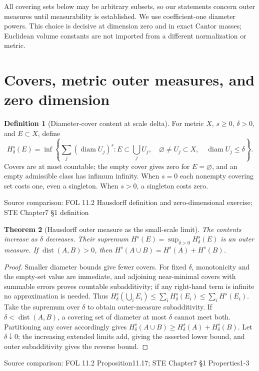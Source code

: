 \documentclass[11pt,oneside,openany]{book}
\newtheorem{theorem}{Theorem}[chapter]
\theoremstyle{definition}
\newtheorem{definition}[theorem]{Definition}
\theoremstyle{remark}
\DeclareMathOperator{\diam}{diam}\DeclareMathOperator{\dist}{dist}
\newcommand{\family}[1]{}
\newcommand{\source}[1]{\par\begingroup\small\sffamily\color{black!65}Source comparison: #1\par\endgroup}
\begin{document}
All covering sets below may be arbitrary subsets, so our statements concern outer measures until measurability is established. We use coefficient-one diameter powers. This choice is decisive at dimension zero and in exact Cantor masses; Euclidean volume constants are not imported from a different normalization or metric.

\section{Covers, metric outer measures, and zero dimension}

\begin{definition}[Diameter-cover content at scale delta]\family{D11.22.hausdorff_scale_content}\label{d11:22:hausdorff-scale-content}
For metric $X$, $s\ge0$, $\delta>0$, and $E\subset X$, define
\[H^s_\delta(E)=\inf\left\{\sum_j(\diam U_j)^s:E\subset\bigcup_jU_j,\quad \varnothing\ne U_j\subset X,\quad\diam U_j\le\delta\right\}.
\]
Covers are at most countable; the empty cover gives zero for $E=\varnothing$, and an empty admissible class has infimum infinity. When $s=0$ each nonempty covering set costs one, even a singleton. When $s>0$, a singleton costs zero.
\end{definition}
\source{FOL 11.2 Hausdorff definition and zero-dimensional exercise; STE Chapter7 §1 definition}

\begin{theorem}[Hausdorff outer measure as the small-scale limit]\family{D11.22.hausdorff_outer_measure}\label{d11:22:hausdorff-outer-measure}
The contents increase as $\delta$ decreases. Their supremum $H^s(E)=\sup_{\delta>0}H^s_\delta(E)$ is an outer measure. If $\dist(A,B)>0$, then $H^s(A\cup B)=H^s(A)+H^s(B)$.
\end{theorem}
\begin{proof}
Smaller diameter bounds give fewer covers. For fixed $\delta$, monotonicity and the empty-set value are immediate, and adjoining near-minimal covers with summable errors proves countable subadditivity; if any right-hand term is infinite no approximation is needed. Thus
$H^s_\delta(\bigcup_iE_i)\le\sum_iH^s_\delta(E_i)\le\sum_iH^s(E_i)$.
Take the supremum over $\delta$ to obtain outer-measure subadditivity. If $\delta<\dist(A,B)$, a covering set of diameter at most $\delta$ cannot meet both. Partitioning any cover accordingly gives $H^s_\delta(A\cup B)\ge H^s_\delta(A)+H^s_\delta(B)$. Let $\delta\downarrow0$; the increasing extended limits add, giving the asserted lower bound, and outer subadditivity gives the reverse bound.
\end{proof}
\source{FOL 11.2 Proposition11.17; STE Chapter7 §1 Properties1-3}
\end{document}
